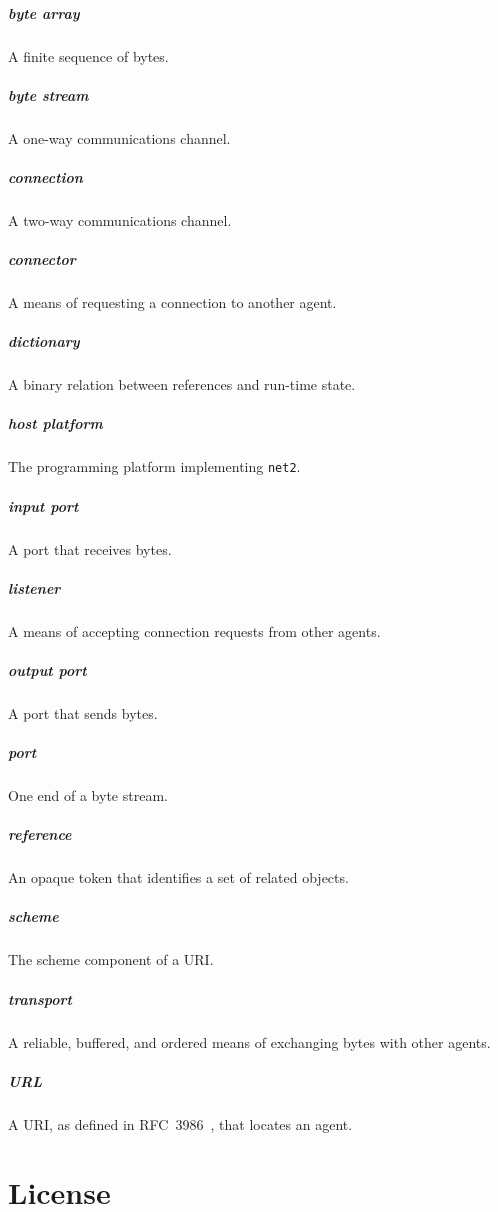 \documentclass[letterpaper,12pt,openany]{report}
\newcommand{\NetTwo}{\texttt{net2}}
\newcommand{\GlossaryItem}[2]{
  \paragraph{#1} #2\vspace{-1ex}
}
\begin{document}
\GlossaryItem{byte array}{A finite sequence of bytes.}

\GlossaryItem{byte stream}{A one-way communications channel.}

\GlossaryItem{connection}{A two-way communications channel.}

\GlossaryItem{connector}{A means of requesting a connection to another agent.}

\GlossaryItem{dictionary}{A binary relation between references and run-time
  state.}

\GlossaryItem{host platform}{The programming platform implementing {\NetTwo}.}

\GlossaryItem{input port}{A port that receives bytes.}

\GlossaryItem{listener}{A means of accepting connection requests from other
  agents.}

\GlossaryItem{output port}{A port that sends bytes.}

\GlossaryItem{port}{One end of a byte stream.}

\GlossaryItem{reference}{An opaque token that identifies a set of related
  objects.}

\GlossaryItem{scheme}{The scheme component of a URI.}

\GlossaryItem{transport}{A reliable, buffered, and ordered means of exchanging
  bytes with other agents.}

\GlossaryItem{URL}{A URI, as defined in RFC~3986~\cite{berners2014rfc}, that
  locates an agent.}



 
\label{cha:references}

\chapter{License}
\label{cha:license}

\end{document}
